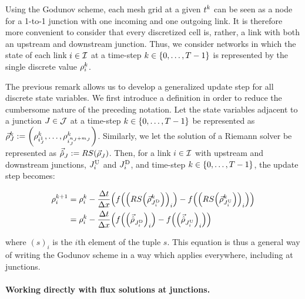 						\begin{rem}
							Using the Godunov scheme, each mesh grid at a given $t^{k}$ can
							be seen as a node for a 1-to-1 junction with one incoming and one
							outgoing link. It is therefore more convenient to consider that every
							discretized cell is, rather, a link with both an upstream and downstream
							junction. Thus, we consider networks in which the state of each link
							$i\in\mathcal{I}$ at a time-step $k\in\intrange 0{\ntime-1}$ is represented
							by the single discrete value $\rho_{i}^{k}$.
						\end{rem}
						The previous remark allows us to develop a generalized update step
						for all discrete state variables. We first introduce a definition
						in order to reduce the cumbersome nature of the preceding notation.
						Let the state variables adjacent to a junction $J\in\mathcal{J}$ at a
						time-step $\tind\in\intrange 0{\ntime-1}$ be represented as $\juncstate{\jn}{\tind}\defeq\tuple{\discrete{\link_{\jn}^{1}}{\tind}}{\discrete{\link_{\jn}^{\ninc_{\jn}+\nout_{\jn}}}{\tind}}$.
						Similarly, we let the solution of a Riemann solver be represented
						as $\junctrace{\jn}{}\defeq\RS\left(\juncstate{\jn}{}\right)$. Then,
						for a link $i\in\mathcal{I}$ with upstream and downstream junctions,
						$J_{i}^{\text{U}}$ and $J_{i}^{\text{D}}$, and time-step $\tind\in\left\{ 0,\ldots,\ntime-1\right\} $,
						the update step becomes:
												
						\begin{align}
							\discrete{\link}{\tind+1} & =\discrete{\link}{\tind}-\dfrac{\Delta t}{\Delta x}\left(f\left(\left(\RS\left(\juncstate{\jdown{\link}}{\tind}\right)\right)_{\link}\right)-f\left(\left(\RS\left(\juncstate{\jup{\link}}{\tind}\right)\right)_{\link}\right)\right)\nonumber \\
							                          & =\discrete{\link}{\tind}-\dfrac{\Delta t}{\Delta x}\left(f\left(\left(\junctrace{\jdown{\link}}{}\right)_{\link}\right)-f\left(\left(\junctrace{\jup{\link}}{}\right)_{\link}\right)\right)\label{eq:reg-update}                               
						\end{align}
												
												
						where $\left(s\right)_{i}$ is the $i$th element of the tuple $s$.
						This equation is thus a general way of writing the Godunov scheme
						in a way which applies everywhere, including at junctions.
												
												
						\paragraph{Working directly with flux solutions at junctions.\label{par:Composing-the-Riemann}}
												
